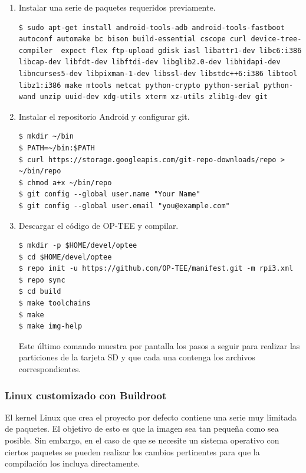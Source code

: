 \begin{enumerate}
	\item Instalar una serie de paquetes requeridos previamente.

\begin{lstlisting}
$ sudo apt-get install android-tools-adb android-tools-fastboot autoconf automake bc bison build-essential cscope curl device-tree-compiler  expect flex ftp-upload gdisk iasl libattr1-dev libc6:i386 libcap-dev libfdt-dev libftdi-dev libglib2.0-dev libhidapi-dev libncurses5-dev libpixman-1-dev libssl-dev libstdc++6:i386 libtool libz1:i386 make mtools netcat python-crypto python-serial python-wand unzip uuid-dev xdg-utils xterm xz-utils zlib1g-dev git
\end{lstlisting}


\item Instalar el repositorio Android y configurar git.


\begin{lstlisting}
$ mkdir ~/bin 
$ PATH=~/bin:$PATH
$ curl https://storage.googleapis.com/git-repo-downloads/repo > ~/bin/repo
$ chmod a+x ~/bin/repo
$ git config --global user.name "Your Name"
$ git config --global user.email "you@example.com"
\end{lstlisting}

\item Descargar el código de OP-TEE y compilar.

\begin{lstlisting}
$ mkdir -p $HOME/devel/optee
$ cd $HOME/devel/optee
$ repo init -u https://github.com/OP-TEE/manifest.git -m rpi3.xml
$ repo sync
$ cd build
$ make toolchains
$ make
$ make img-help
\end{lstlisting}

Este último comando muestra por pantalla los pasos a seguir para realizar las particiones de la tarjeta SD y que cada una contenga los archivos correspondientes.

\end{enumerate}


\subsubsection{Linux customizado con Buildroot}
El kernel Linux que crea el proyecto por defecto contiene una serie muy limitada de paquetes. El objetivo de esto es que la imagen sea tan pequeña como sea posible. Sin embargo, en el caso de que se necesite un sistema operativo con ciertos paquetes se pueden realizar los cambios pertinentes para que la compilación los incluya directamente. \newline

